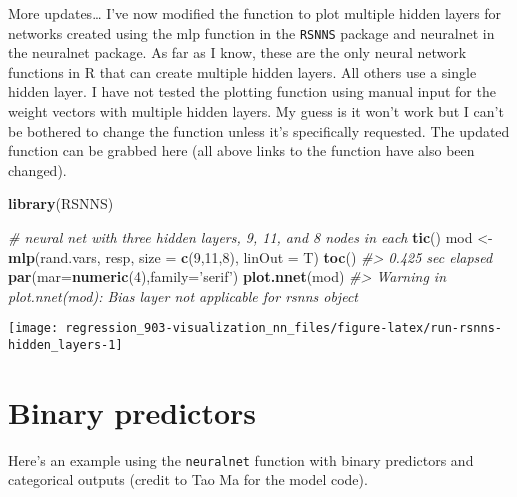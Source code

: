 \documentclass[]{book}
\newenvironment{Shaded}{\begin{snugshade}}{\end{snugshade}}
\newcommand{\CommentTok}[1]{\textcolor[rgb]{0.56,0.35,0.01}{\textit{#1}}}
\newcommand{\DataTypeTok}[1]{\textcolor[rgb]{0.13,0.29,0.53}{#1}}
\newcommand{\DecValTok}[1]{\textcolor[rgb]{0.00,0.00,0.81}{#1}}
\newcommand{\KeywordTok}[1]{\textcolor[rgb]{0.13,0.29,0.53}{\textbf{#1}}}
\newcommand{\NormalTok}[1]{#1}
\newcommand{\StringTok}[1]{\textcolor[rgb]{0.31,0.60,0.02}{#1}}
\begin{document}
More updates\ldots{} I've now modified the function to plot multiple hidden layers for networks created using the mlp function in the \texttt{RSNNS} package and neuralnet in the neuralnet package. As far as I know, these are the only neural network functions in R that can create multiple hidden layers. All others use a single hidden layer. I have not tested the plotting function using manual input for the weight vectors with multiple hidden layers. My guess is it won't work but I can't be bothered to change the function unless it's specifically requested. The updated function can be grabbed here (all above links to the function have also been changed).

\begin{Shaded}
\begin{Highlighting}[]
\KeywordTok{library}\NormalTok{(RSNNS)}
 
\CommentTok{# neural net with three hidden layers, 9, 11, and 8 nodes in each}
\KeywordTok{tic}\NormalTok{()}
\NormalTok{mod <-}\KeywordTok{mlp}\NormalTok{(rand.vars, resp, }
          \DataTypeTok{size =} \KeywordTok{c}\NormalTok{(}\DecValTok{9}\NormalTok{,}\DecValTok{11}\NormalTok{,}\DecValTok{8}\NormalTok{), }
          \DataTypeTok{linOut =}\NormalTok{ T)}
\KeywordTok{toc}\NormalTok{()}
\CommentTok{#> 0.425 sec elapsed}
\KeywordTok{par}\NormalTok{(}\DataTypeTok{mar=}\KeywordTok{numeric}\NormalTok{(}\DecValTok{4}\NormalTok{),}\DataTypeTok{family=}\StringTok{'serif'}\NormalTok{)}
\KeywordTok{plot.nnet}\NormalTok{(mod)}
\CommentTok{#> Warning in plot.nnet(mod): Bias layer not applicable for rsnns object}
\end{Highlighting}
\end{Shaded}

\begin{center}\texttt{[image: regression\_903-visualization\_nn\_files/figure-latex/run-rsnns-hidden\_layers-1]} \end{center}

\hypertarget{binary-predictors}{%
\section{Binary predictors}\label{binary-predictors}}

Here's an example using the \texttt{neuralnet} function with binary predictors and categorical outputs (credit to Tao Ma for the model code).
\end{document}
